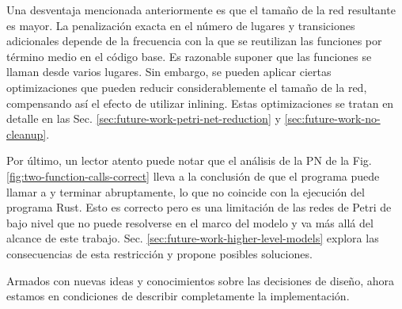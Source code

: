 Una desventaja mencionada anteriormente es que el tamaño de la red resultante es mayor. La
penalización exacta en el número de lugares y transiciones adicionales depende de la
frecuencia con la que se reutilizan las funciones por término medio en el código base. Es
razonable suponer que las funciones se llaman desde varios lugares. Sin embargo, se pueden
aplicar ciertas optimizaciones que pueden reducir considerablemente el tamaño de la red,
compensando así el efecto de utilizar inlining. Estas optimizaciones se tratan en detalle en las
Sec. \ref{sec:future-work-petri-net-reduction} y \ref{sec:future-work-no-cleanup}.

Por último, un lector atento puede notar que
el análisis de la \acrshort{PN} de la Fig. \ref{fig:two-function-calls-correct} lleva a la
conclusión de que el programa puede llamar a  y terminar abruptamente,
lo que no coincide con la ejecución del programa Rust.
Esto es correcto pero es una limitación de las redes de Petri de bajo nivel
que no puede resolverse en el marco del modelo y va más allá del
alcance de este trabajo.
Sec. \ref{sec:future-work-higher-level-models} explora
las consecuencias de esta restricción y propone posibles soluciones.

Armados con nuevas ideas y conocimientos sobre las decisiones de diseño,
ahora estamos en condiciones de describir completamente la implementación.